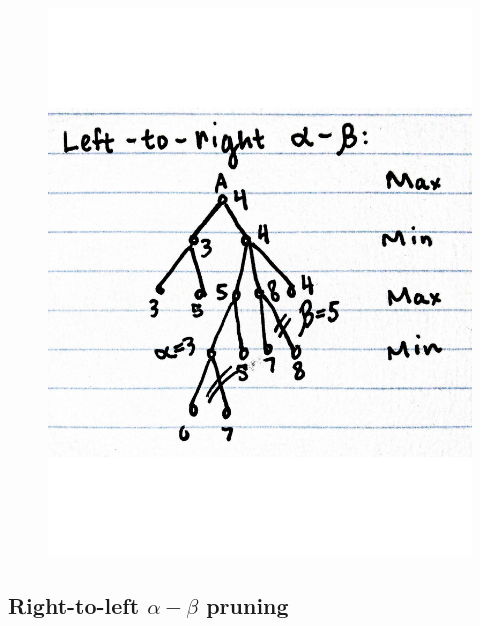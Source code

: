 \documentclass[11pt]{article}
\begin{document}
\begin{figure}[H]
\centering
\includegraphics[scale=.5]{ltor.pdf}
\end{figure}

\subsection{Right-to-left $\alpha-\beta$ pruning}
\end{document}
